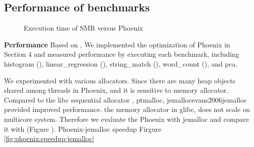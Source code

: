 \subsection{Performance of benchmarks}
\begin{figure}[htpb]
	\centering
	\caption{Execution time of SMR versus Phoenix}
	\label{fig:time}
\end{figure}
{\bf Performance}
Based on \myth, We implemented the optimization of Phoenix in Section 4 and measured \myds performance by executing each benchmark, including histogram (), linear\_regression (), string\_match (), word\_count (), and pca.



We experimented with various allocators.
Since there are many heap objects shared among threads
in Phoenix, and it is sensitive to memory allocator.
Compared to the libc sequential allocator ,  
ptmalloc\cite{gloger1997ptmalloc},
jemalloc{evans2006jemalloc} provided improved performance. 
the memory allocator in glibc, does not scale on multicore system. 
Therefore we evaluate the Phoenix with jemalloc and
compare it  with \myds(Figure \label{fig:dmr:time:jemalloc}).
Phoenix-jemalloc speedup Firgure \ref{fig:phoenix:speedup:jemalloc}

